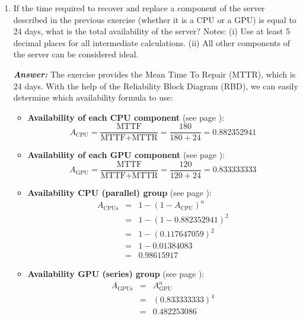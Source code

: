 \begin{enumerate}
    \newpage

    \item If the time required to recover and replace a component of the server described in the previous exercise (whether it is a CPU or a GPU) is equal to 24 days, what is the total availability of the server? Notes: (i) Use at least 5 decimal places for all intermediate calculations. (ii) All other components of the server can be considered ideal.
    
    \textcolor{Green3}{\textbf{\emph{Answer:}}} The exercise provides the Mean Time To Repair (MTTR), which is 24 days. With the help of the Reliability Block Diagram (RBD), we can easily determine which availability formula to use:
    \begin{itemize}
        \item \textbf{Availability of each CPU component} (see page \pageref{eq: Availability}):
        \begin{equation*}
            A_{\text{CPU}} = \dfrac{\text{MTTF}}{\text{MTTF} + \text{MTTR}} = \dfrac{180}{180+24} = 0.882352941
        \end{equation*}
        
        \item \textbf{Availability of each GPU component} (see page \pageref{eq: Availability}):
        \begin{equation*}
            A_{\text{GPU}} = \dfrac{\text{MTTF}}{\text{MTTF} + \text{MTTR}} = \dfrac{120}{120+24} = 0.833333333
        \end{equation*}

        \item \textbf{Availability CPU (parallel) group} (see page \pageref{eq: Availability of Parallel System - Simplified}):
        \begin{equation*}
            \begin{array}{rcl}
                A_{\text{CPUs}} &=& 1 - \left(1 - A_{\text{CPU}}\right)^{n} \\ [.5em]
                &=& 1 - \left(1 - 0.882352941\right)^{2} \\ [.5em]
                &=& 1 - \left(0.117647059\right)^{2} \\ [.5em]
                &=& 1 - 0.01384083 \\ [.5em]
                &=& 0.98615917
            \end{array}
        \end{equation*}

        \item \textbf{Availability GPU (series) group} (see page \pageref{eq: Availability of Series System - Simplified}):
        \begin{equation*}
            \begin{array}{rcl}
                A_{\text{GPUs}} &=& A_{\text{GPU}}^{n} \\ [.5em]
                &=& \left(0.833333333\right)^{4} \\ [.5em]
                &=& 0.482253086
            \end{array}
        \end{equation*}


\end{itemize}
\end{enumerate}
